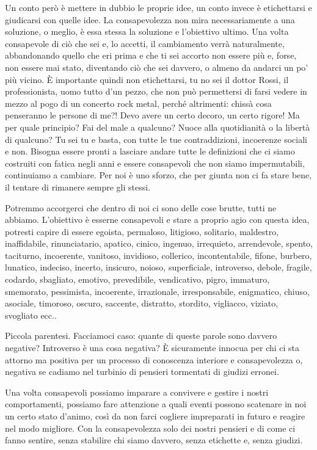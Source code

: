 \documentclass[12pt]{book} %
\begin{document}
Un conto però è mettere in dubbio le proprie idee, un conto invece è etichettarsi e giudicarsi con quelle idee. La
consapevolezza non mira necessariamente a una soluzione, o meglio, è essa stessa la soluzione e
l'obiettivo ultimo. Una volta consapevole di ciò che sei e, lo accetti, il cambiamento verrà
naturalmente, abbandonando quello che eri prima e che ti sei accorto non essere più e, forse, non essere mai stato,
diventando ciò che sei davvero, o almeno da andarci un po' più vicino. È importante quindi non
etichettarsi, tu no sei il dottor Rossi, il professionista, uomo tutto d'un pezzo, che non può
permettersi di farsi vedere in mezzo al pogo di un concerto rock metal, perché altrimenti: chissà cosa penseranno le
persone di me?! Devo avere un certo decoro, un certo rigore! Ma per quale principio? Fai del male a qualcuno? Nuoce
alla quotidianità o la libertà di qualcuno? Tu sei tu e basta, con tutte le tue contraddizioni, incoerenze sociali e
non. Bisogna essere pronti a lasciare andare tutte le definizioni che ci siamo costruiti con fatica negli anni e essere
consapevoli che non siamo impermutabili, continuiamo a cambiare. Per noi è uno sforzo, che per giunta non ci fa stare
bene, il tentare di rimanere sempre gli stessi.


\bigskip

Potremmo accorgerci che dentro di noi ci sono delle cose brutte, tutti ne abbiamo. L'obiettivo è
esserne consapevoli e stare a proprio agio con questa idea, potresti capire di essere egoista, permaloso, litigioso,
solitario, maldestro, inaffidabile, rinunciatario, apatico, cinico, ingenuo, irrequieto, arrendevole, spento,
taciturno, incoerente, vanitoso, invidioso, collerico, incontentabile, fifone, burbero, lunatico, indeciso, incerto,
insicuro, noioso, superficiale, introverso, debole, fragile, codardo, sbagliato, emotivo, prevedibile, vendicativo,
pigro, immaturo, smemorato, pessimista, incoerente, irrazionale, irresponsabile, enigmatico, chiuso, asociale,
timoroso, oscuro, saccente, distratto, stordito, vigliacco, viziato, svogliato ecc..

Piccola parentesi. Facciamoci caso: quante di queste parole sono davvero negative? Introverso è una cosa negativa? È
sicuramente innocua per chi ci sta attorno ma positiva per un processo di conoscenza interiore e consapevolezza o,
negativa se cadiamo nel turbinio di pensieri tormentati di giudizi erronei.

Una volta consapevoli possiamo imparare a convivere e gestire i nostri comportamenti, possiamo fare attenzione a quali
eventi possono scatenare in noi un certo stato d'animo, così da non farci cogliere impreparati in
futuro e reagire nel modo migliore. Con la consapevolezza solo dei nostri pensieri e di come ci fanno sentire, senza
stabilire chi siamo davvero, senza etichette e, senza giudizi. 
\end{document}
